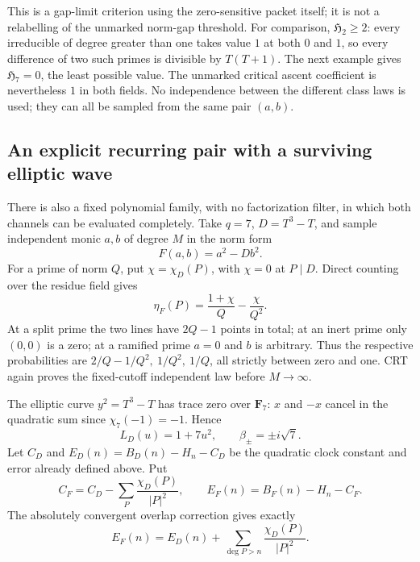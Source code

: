 \documentclass[11pt]{article}
\newcommand{\F}{\mathbf F}
\begin{document}
This is a gap-limit criterion using the zero-sensitive packet itself;
it is not a relabelling of the unmarked norm-gap threshold.
For comparison, \({\mathfrak H}_2\geq2\): every irreducible of degree
greater than one takes value \(1\) at both \(0\) and \(1\), so every
difference of two such primes is divisible by \(T(T+1)\).
The next example gives \({\mathfrak H}_7=0\), the least possible value.
The unmarked critical ascent coefficient is nevertheless \(1\) in
both fields. No independence between the different class laws is
used; they can all be sampled from the same pair \((a,b)\).

\subsection{An explicit recurring pair with a surviving elliptic wave}
There is also a fixed polynomial family, with no factorization filter,
in which both channels can be evaluated completely.
Take \(q=7\), \(D=T^3-T\), and sample independent monic \(a,b\) of
degree \(M\) in the norm form
\[
                              F(a,b)=a^2-Db^2.
\]
For a prime of norm \(Q\), put \(\chi=\chi_D(P)\), with
\(\chi=0\) at \(P\mid D\). Direct counting over the residue field gives
\begin{equation}\label{eq:normFormProbability}
                    \eta_F(P)=\frac{1+\chi}{Q}-\frac{\chi}{Q^2}.
\end{equation}
At a split prime the two lines have \(2Q-1\) points in total; at an
inert prime only \((0,0)\) is a zero; at a ramified prime \(a=0\)
and \(b\) is arbitrary. Thus the respective probabilities are
\(2/Q-1/Q^2,\ 1/Q^2,\ 1/Q\), all strictly between zero and one.
CRT again proves the fixed-cutoff independent law before \(M\to\infty\).

The elliptic curve \(y^2=T^3-T\) has trace zero over \(\F_7\):
\(x\) and \(-x\) cancel in the quadratic sum since
\(\chi_7(-1)=-1\). Hence
\[
              L_D(u)=1+7u^2,\qquad \beta_\pm=\pm i\sqrt7.
\]
Let \(C_D\) and \(E_D(n)=B_D(n)-H_n-C_D\) be the quadratic clock
constant and error already defined above. Put
\[
 C_F=C_D-\sum_P\frac{\chi_D(P)}{|P|^2},\qquad
 E_F(n)=B_F(n)-H_n-C_F.
\]
The absolutely convergent overlap correction gives exactly
\[
 E_F(n)=E_D(n)+\sum_{\deg P>n}\frac{\chi_D(P)}{|P|^2}.
\]
\end{document}
